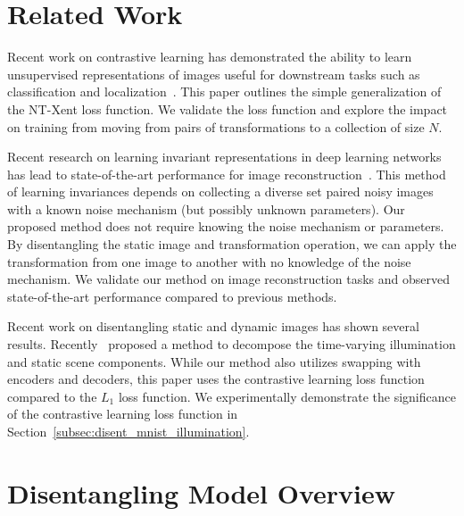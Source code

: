 \documentclass[11pt]{article}
\begin{document}
\section{Related Work}


Recent work on contrastive learning has demonstrated the ability to learn unsupervised representations of images useful for downstream tasks such as classification and localization~\cite{chen2020simple}. This paper outlines the simple generalization of the NT-Xent loss function. We validate the loss function and explore the impact on training from moving from pairs of transformations to a collection of size $N$. 

Recent research on learning invariant representations in deep learning networks has lead to state-of-the-art performance for image reconstruction~\cite{xia2019training}. This method of learning invariances depends on collecting a diverse set paired noisy images with a known noise mechanism (but possibly unknown parameters). Our proposed method does not require knowing the noise mechanism or parameters. By disentangling the static image and transformation operation, we can apply the transformation from one image to another with no knowledge of the noise mechanism. 
We validate our method on image reconstruction tasks and observed state-of-the-art performance compared to previous methods.


Recent work on disentangling static and dynamic images has shown several results. Recently~\cite{liu2020learning} proposed a method to decompose the time-varying illumination and static scene components. While our method also utilizes swapping with encoders and decoders, this paper uses the contrastive learning loss function compared to the $L_1$ loss function. We experimentally demonstrate the significance of the contrastive learning loss function in Section~\ref{subsec:disent_mnist_illumination}.


\section{Disentangling Model Overview}
\end{document}
